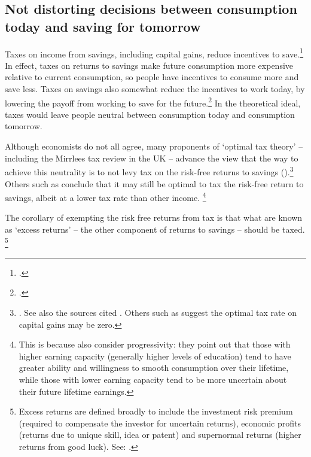 \subsection{Not distorting decisions between consumption today and saving for tomorrow}
Taxes on income from savings, including capital gains, reduce incentives to save.\footcites[][32]{HenryTaxReview2010}[][58]{Treasury2015ReThink}[][295]{MirrleesAdamBesleyEtAl2011}  In effect, taxes on returns to savings make future consumption more expensive relative to current consumption, so people have incentives to consume more and save less. Taxes on savings also somewhat reduce the incentives to work today, by lowering the payoff from working to save for the future.\footcite[][12]{HenryTaxReview2010}  In the theoretical ideal, taxes would leave people neutral between consumption today and consumption tomorrow.

Although economists do not all agree, many proponents of ‘optimal tax theory’ – including the Mirrlees tax review in the UK  – advance the view that the way to achieve this neutrality is to not levy tax on the risk-free returns to savings ().\footnote{\textcite[][284]{MirrleesAdamBesleyEtAl2011}. See also the sources cited \textcite[][2]{Ingles2015}. Others such as \textcite[][1]{Carling2015} suggest the optimal tax rate on capital gains may be zero.} 
Others such as \textcite{BanksDiamond2008}\DEVIATION{} %
conclude that it may still be optimal to tax the risk-free return to savings, albeit at a lower tax rate than other income.%
\footnote{This is because \textcite{BanksDiamond2008} also consider progressivity: they point out that those with higher earning capacity (generally higher levels of education) tend to have greater ability and willingness to smooth consumption over their lifetime, while those with lower earning capacity tend to be more uncertain about their future lifetime earnings.}  


The corollary of exempting the risk free returns from tax is that what are known as ‘excess returns’ – the other component of returns to savings – should be taxed.%
\footnote{Excess returns are defined broadly to include the investment risk premium (required to compensate the investor for uncertain returns), economic profits (returns due to unique skill, idea or patent) and supernormal returns (higher returns from good luck). See: \textcite[][153]{PresidentsAdvisoryPanelTaxReform2005Proposals}.}

